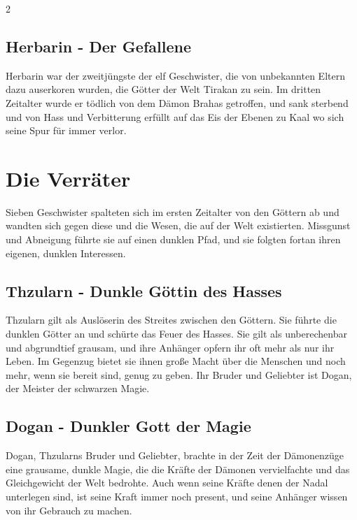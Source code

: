 \begin{multicols}{2}
{\subsection{Herbarin - Der Gefallene}\label{subsec:herbarin-der-gefallene}

Herbarin war der zweitjüngste der elf Geschwister, die von unbekannten Eltern dazu auserkoren wurden, die Götter der Welt Tirakan zu sein.
Im dritten Zeitalter wurde er tödlich von dem Dämon Brahas getroffen, und sank sterbend und von Hass und Verbitterung erfüllt auf das Eis der Ebenen zu Kaal wo sich seine Spur für immer verlor.

\section{Die Verräter}\label{sec:die-verrater}

Sieben Geschwister spalteten sich im ersten Zeitalter von den Göttern ab und wandten sich gegen diese und die Wesen, die auf der Welt existierten.
Missgunst und Abneigung führte sie auf einen dunklen Pfad, und sie folgten fortan ihren eigenen, dunklen Interessen.

\subsection{Thzularn - Dunkle Göttin des Hasses}\label{subsec:thzularn-dunkle-gottin-des-hasses}

Thzularn gilt als Auslöserin des Streites zwischen den Göttern.
Sie führte die dunklen Götter an und schürte das Feuer des Hasses.
Sie gilt als unberechenbar und abgrundtief grausam, und ihre Anhänger opfern ihr oft mehr als nur ihr Leben.
Im Gegenzug bietet sie ihnen große Macht über die Menschen und noch mehr, wenn sie bereit sind, genug zu geben.
Ihr Bruder und Geliebter ist Dogan, der Meister der schwarzen Magie.

\subsection{Dogan - Dunkler Gott der Magie}\label{subsec:dogan-dunkler-gott-der-magie}

Dogan, Thzularns Bruder und Geliebter, brachte in der Zeit der Dämonenzüge eine grausame, dunkle Magie, die die Kräfte der Dämonen vervielfachte und das Gleichgewicht der Welt bedrohte.
Auch wenn seine Kräfte denen der Nadal unterlegen sind, ist seine Kraft immer noch present, und seine Anhänger wissen von ihr Gebrauch zu machen.

}
\end{multicols}

